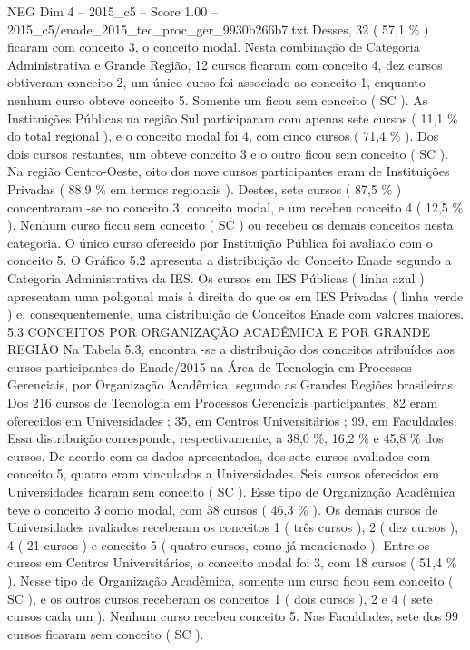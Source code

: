\begin{textsample}{NEG Dim 4 – 2015\_c5 – Score 1.00 – 2015\_c5/enade\_2015\_tec\_proc\_ger\_9930b266b7.txt}
Desses, 32 ( 57,1 \% ) ficaram com conceito 3, o conceito modal.
Nesta combinação de Categoria Administrativa e Grande Região, 12 cursos ficaram com conceito 4, dez cursos obtiveram conceito 2, um único curso foi associado ao conceito 1, enquanto nenhum curso obteve conceito 5.
Somente um ficou sem conceito ( SC ).
As Instituições Públicas na região Sul participaram com apenas sete cursos ( 11,1 \% do total regional ), e o conceito modal foi 4, com cinco cursos ( 71,4 \% ).
Dos dois cursos restantes, um obteve conceito 3 e o outro ficou sem conceito ( SC ).
Na região Centro-Oeste, oito dos nove cursos participantes eram de Instituições Privadas ( 88,9 \% em termos regionais ).
Destes, sete cursos ( 87,5 \% ) concentraram -se no conceito 3, conceito modal, e um recebeu conceito 4 ( 12,5 \% ).
Nenhum curso ficou sem conceito ( SC ) ou recebeu os demais conceitos nesta categoria.
O único curso oferecido por Instituição Pública foi avaliado com o conceito 5.
O Gráfico 5.2 apresenta a distribuição do Conceito Enade segundo a Categoria Administrativa da IES.
Os cursos em IES Públicas ( linha azul ) apresentam uma poligonal mais à direita do que os em IES Privadas ( linha verde ) e, consequentemente, uma distribuição de Conceitos Enade com valores maiores. 5.3 CONCEITOS POR ORGANIZAÇÃO ACADÊMICA E POR GRANDE REGIÃO Na Tabela 5.3, encontra -se a distribuição dos conceitos atribuídos aos cursos participantes do Enade/2015 na Área de Tecnologia em Processos Gerenciais, por Organização Acadêmica, segundo as Grandes Regiões brasileiras.
Dos 216 cursos de Tecnologia em Processos Gerenciais participantes, 82 eram oferecidos em Universidades ; 35, em Centros Universitários ; 99, em Faculdades.
Essa distribuição corresponde, respectivamente, a 38,0 \%, 16,2 \% e 45,8 \% dos cursos.
De acordo com os dados apresentados, dos sete cursos avaliados com conceito 5, quatro eram vinculados a Universidades.
Seis cursos oferecidos em Universidades ficaram sem conceito ( SC ).
Esse tipo de Organização Acadêmica teve o conceito 3 como modal, com 38 cursos ( 46,3 \% ).
Os demais cursos de Universidades avaliados receberam os conceitos 1 ( três cursos ), 2 ( dez cursos ), 4 ( 21 cursos ) e conceito 5 ( quatro cursos, como já mencionado ).
Entre os cursos em Centros Universitários, o conceito modal foi 3, com 18 cursos ( 51,4 \% ).
Nesse tipo de Organização Acadêmica, somente um curso ficou sem conceito ( SC ), e os outros cursos receberam os conceitos 1 ( dois cursos ), 2 e 4 ( sete cursos cada um ).
Nenhum curso recebeu conceito 5.
Nas Faculdades, sete dos 99 cursos ficaram sem conceito ( SC ).

\end{textsample}
